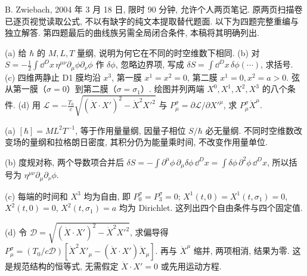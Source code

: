 B. Zwiebach, 2004 年 3 月 18 日, 限时 90 分钟, 允许个人两页笔记. 原两页扫描卷已逐页视觉读取公式, 不以有缺字的纯文本提取替代题面. 以下为四题完整重编与独立解答. 第四题最后的曲线族另需全局闭合条件, 本稿将其明确列出.

\begin{exercise}
(a) 给 $\hbar$ 的 $M,L,T$ 量纲, 说明为何它在不同的时空维数下相同.
(b) 对 $S=-\frac12\int\dd^Dx\,\eta^{\mu\nu}\partial_\mu\phi\partial_\nu\phi$ 作 $\delta\phi$, 忽略边界项, 写成 $\delta S=\int\dd^Dx\,\delta\phi(\cdots)$, 求括号.
(c) 四维两静止 D1 膜均沿 $x^3$, 第一膜 $x^1=x^2=0$, 第二膜 $x^1=0,x^2=a>0$. 弦从第一膜（$\sigma=0$）到第二膜（$\sigma=\sigma_1$）. 绘图并列两端 $X^0,X^1,X^2,X^3$ 的八个条件.
(d) 用 $\mathcal L=-\frac{T_0}{c}\sqrt{(\dot X\cdot X')^2-\dot X^2X'^2}$ 与
$P^\sigma_\mu=\partial\mathcal L/\partial X'^\mu$, 求 $P^\sigma_\mu\dot X^\mu$.
\end{exercise}
\begin{solution}
(a) $[\hbar]=ML^2T^{-1}$, 等于作用量量纲, 因量子相位 $S/\hbar$ 必无量纲. 不同时空维数改变场的量纲和拉格朗日密度, 其积分仍为能量乘时间, 不改变作用量单位.

(b) 度规对称, 两个导数项合并后
$\delta S=-\int\partial^\mu\phi\,\partial_\mu\delta\phi\,\dd^Dx
=\int\delta\phi\,\partial^2\phi\,\dd^Dx$,
所以括号为 $\eta^{\mu\nu}\partial_\mu\partial_\nu\phi$.

(c) 每端的时间和 $X^3$ 均为自由, 即 $P_0^\sigma=P_3^\sigma=0$;
$X^1(t,0)=X^1(t,\sigma_1)=0$, $X^2(t,0)=0$, $X^2(t,\sigma_1)=a$ 均为 Dirichlet. 这列出四个自由条件与四个固定值.
\begin{center}
\end{center}

(d) 令 $\mathcal D=\sqrt{(\dot X\cdot X')^2-\dot X^2X'^2}$, 求偏导得
$P_\mu^\sigma=(T_0/c\mathcal D)[\dot X^2X'_\mu-(\dot X\cdot X')\dot X_\mu]$.
再与 $\dot X^\mu$ 缩并, 两项相消, 结果为零. 这是规范结构的恒等式, 无需假定 $\dot X\cdot X'=0$ 或先用运动方程.
\end{solution}

